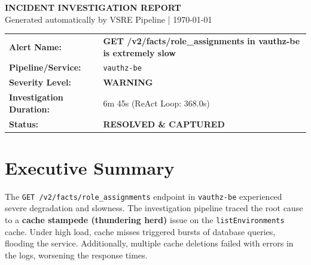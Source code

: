 \documentclass[10pt,a4paper]{article}
\begin{document}
\begin{center}
    {\fontsize{18}{22}\selectfont \color{primary}\textbf{INCIDENT INVESTIGATION REPORT}} \\
    \vspace{2pt}
    {\fontsize{10}{12}\selectfont \color{textdark}Generated automatically by VSRE Pipeline | \today}
\end{center}
\vspace{10pt}

\begin{tcolorbox}[
    colback=bglight,
    colframe=primary,
    leftrule=4pt,
    arc=3pt,
    boxrule=0.5pt,
    left=12pt, right=12pt, top=10pt, bottom=10pt
]
    \begin{tabularx}{\textwidth}{@{} l X @{}}
        \textbf{Alert Name:}     & \color{primary}\textbf{GET /v2/facts/\allowbreak role\_assignments in vauthz-be is extremely slow} \\
        \textbf{Pipeline/Service:} & \texttt{vauthz-be} \\
        \textbf{Severity Level:}   & \color{accent}\textbf{WARNING} \\
        \textbf{Investigation Duration:} & 6m 45s (ReAct Loop: 368.0s) \\
        \textbf{Status:}          & \color{secondary}\textbf{RESOLVED \& CAPTURED} \\
    \end{tabularx}
\end{tcolorbox}

\vspace{5pt}

\section{Executive Summary}
The \texttt{GET /v2/facts/\allowbreak role\_assignments} endpoint in \texttt{vauthz-be} experienced severe degradation and slowness. The investigation pipeline traced the root cause to a \textbf{cache stampede (thundering herd)} issue on the \texttt{listEnvironments} cache. Under high load, cache misses triggered bursts of database queries, flooding the service. Additionally, multiple cache deletions failed with errors in the logs, worsening the response times.

\vspace{5pt}

\end{document}

